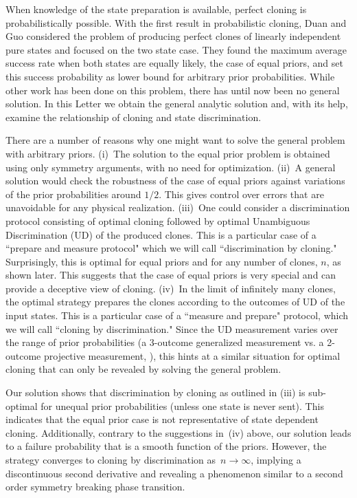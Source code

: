 \documentclass[aps,prl,twocolumn,showpacs]{revtex4}
\begin{document}
When knowledge of the state preparation is available, perfect cloning is probabilistically possible. With the first result in probabilistic cloning, Duan and Guo \cite{DuanGuo} considered the problem of producing perfect clones of linearly independent pure states and focused on the two state case.  They found the maximum average success rate when both states are equally likely, the case of equal priors, and set this success probability as lower bound for arbitrary prior probabilities.  While other work has been done on this problem, there has until now been no general solution. In this Letter we obtain the general analytic solution and, with its help, examine the relationship of cloning and state discrimination.
 
There are a number of reasons why one might want to solve the general problem with arbitrary priors.  (i)~The solution to the equal prior problem is obtained using only symmetry arguments, with no need for optimization. (ii)~A general solution would check the robustness of the case of equal priors against variations of the prior probabilities around $1/2$.  This gives control over errors that are unavoidable for any physical realization. (iii)~One could consider a discrimination protocol consisting of optimal cloning followed by optimal Unambiguous Discrimination (UD) of the produced clones. This is a particular case of a ``prepare and measure protocol" which we will call ``discrimination by cloning." Surprisingly, this is optimal for equal priors and for any number of clones, $n$, as shown later.  This suggests that the case of equal priors is very special and can provide a deceptive view of cloning.  (iv)~In the limit of infinitely many clones, the optimal strategy prepares the clones according to the outcomes of UD of the input states. This is a particular case of a ``measure and prepare" protocol, which we will call ``cloning by discrimination." Since the UD measurement varies over the range of prior probabilities (a 3-outcome generalized measurement vs. a 2-outcome projective measurement, \cite{Bergou}), this hints at a similar situation for optimal cloning that can only be revealed by solving the general problem. 

Our solution shows that discrimination by cloning as outlined in (iii) is sub-optimal for unequal prior probabilities (unless one state is never sent). This indicates that the equal prior case is not representative of state dependent cloning.  Additionally, contrary to the suggestions in~(iv) above, our solution leads to a failure probability that is a smooth function of the priors. However,  the strategy converges to cloning by discrimination as~$n\to\infty$, implying a discontinuous second derivative and revealing a phenomenon similar to a second order symmetry breaking phase transition.
\end{document}
